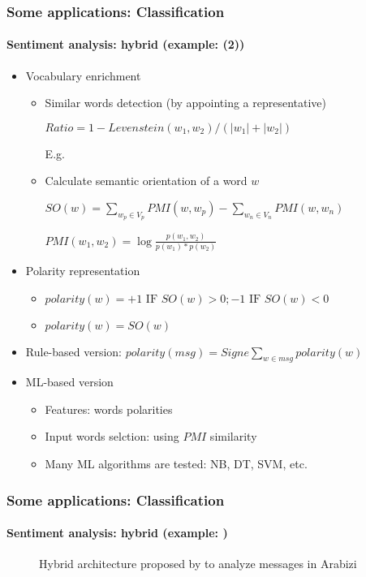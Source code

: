 \documentclass[xcolor=table]{beamer}
\begin{document}
\begin{frame}
	\frametitle{Some applications: Classification}
	\framesubtitle{Sentiment analysis: hybrid (example: \cite{18-bettiche-al} (2)) }
	
	\begin{itemize}
		\item Vocabulary enrichment
		\begin{itemize}
			\item Similar words detection (by appointing a representative)
			
			$Ratio = 1 - Levenstein(w_1, w_2)/(|w_1|+|w_2|)$
			
			E.g. 
			
			\item Calculate semantic orientation of a word $w$
			
			
			$SO(w) = \sum_{w_p \in V_p} PMI(w, w_p) - \sum_{w_n \in V_n} PMI(w, w_n)$
			
			$PMI (w_1, w_2) = \log \frac{p(w_1, w_2)}{p(w_1)*p(w_2)}$
		\end{itemize}
		\item Polarity representation
		\begin{itemize}
			\item $polarity(w) = +1 \text{ IF } SO(w) > 0; -1 \text{ IF } SO(w) < 0$
			\item $polarity(w) = SO(w)$
		\end{itemize}
		\item Rule-based version: $polarity(msg) = Signe \sum_{w \in msg} polarity(w)$
		\item ML-based version
		\begin{itemize}
			\item Features: words polarities
			\item Input words selction: using $PMI$ similarity
			\item Many ML algorithms are tested: NB, DT, SVM, etc.
		\end{itemize}
	\end{itemize}
	
\end{frame}

\begin{frame}
	\frametitle{Some applications: Classification}
	\framesubtitle{Sentiment analysis: hybrid (example: \cite{18-guellil-al})}
	
	\begin{figure}
		\centering
		\caption{Hybrid architecture proposed by \cite{18-guellil-al} to analyze messages in Arabizi}
	\end{figure}
	
\end{frame}
\end{document}
